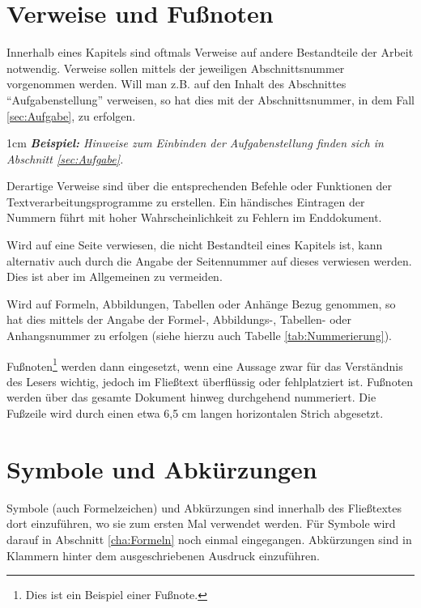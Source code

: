 \section{Verweise und Fußnoten}
\label{sec:Verweise}

Innerhalb eines Kapitels sind oftmals Verweise auf andere Bestandteile der Arbeit notwendig. Verweise sollen mittels der jeweiligen Abschnittsnummer vorgenommen werden. Will man z.B. auf den Inhalt des Abschnittes "`Aufgabenstellung"' verweisen, so hat dies mit der Abschnittsnummer, in dem Fall \ref{sec:Aufgabe}, zu erfolgen. 

\begin{addmargin}[1cm]{1cm}
	\textit{\textbf{Beispiel:} Hinweise zum Einbinden der Aufgabenstellung finden sich in Abschnitt \ref{sec:Aufgabe}.}
\end{addmargin}

Derartige Verweise sind über die entsprechenden Befehle oder Funktionen der Textverarbeitungsprogramme zu erstellen. Ein händisches Eintragen der Nummern führt mit hoher Wahrscheinlichkeit zu Fehlern im Enddokument. 

Wird auf eine Seite verwiesen, die nicht Bestandteil eines Kapitels ist, kann alternativ auch durch die Angabe der Seitennummer auf dieses verwiesen werden. Dies ist aber im Allgemeinen zu vermeiden.

Wird auf Formeln, Abbildungen, Tabellen oder Anhänge Bezug genommen, so hat dies mittels der Angabe der Formel-, Abbildungs-, Tabellen- oder Anhangsnummer zu erfolgen (siehe hierzu auch Tabelle \ref{tab:Nummerierung}).

Fußnoten\footnote{Dies ist ein Beispiel einer Fußnote.} werden dann eingesetzt, wenn eine Aussage zwar für das Verständnis des Lesers wichtig, jedoch im Fließtext überflüssig oder fehlplatziert ist. Fußnoten werden über das gesamte Dokument hinweg durchgehend nummeriert. Die Fußzeile wird durch einen etwa 6,5 cm langen horizontalen Strich abgesetzt.

\section{Symbole und Abkürzungen}
\label{sec:Abk}

Symbole (auch Formelzeichen) und Abkürzungen sind innerhalb des Fließtextes dort einzuführen, wo sie zum ersten Mal verwendet werden. Für Symbole wird darauf in Abschnitt \ref{cha:Formeln} noch einmal eingegangen. Abkürzungen sind in Klammern hinter dem ausgeschriebenen Ausdruck einzuführen. 

